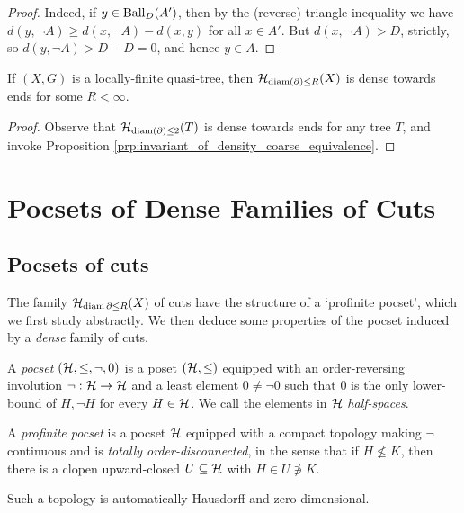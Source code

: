 \documentclass{amsart}
\begin{document}
\begin{proof}
        Indeed, if $y\in\operatorname{Ball}_D(A')$, then by the (reverse) triangle-inequality we have $d(y,\lnot A)\geq d(x,\lnot A)-d(x,y)$ for all $x\in A'$. But $d(x,\lnot A)>D$, strictly, so $d(y,\lnot A)>D-D=0$, and hence $y\in A$.
    \end{proof}

    \begin{corollary}
        If $(X,G)$ is a locally-finite quasi-tree, then $\mathcal{H}_{\operatorname{diam}(\partial)\leq R}(X)$ is dense towards ends for some $R<\infty$.
    \end{corollary}
    \begin{proof}
        Observe that $\mathcal{H}_{\operatorname{diam}(\partial)\leq2}(T)$ is dense towards ends for any tree $T$, and invoke Proposition \ref{prp:invariant_of_density_coarse_equivalence}.
    \end{proof}

    \section{Pocsets of Dense Families of Cuts}

    \subsection{Pocsets of cuts}\label{sec:pocsets_of_cuts}

    The family $\mathcal{H}_{\operatorname{diam}\partial\leq R}(X)$ of cuts have the structure of a `profinite pocset', which we first study abstractly. We then deduce some properties of the pocset induced by a \textit{dense} family of cuts.

    \begin{definition}\label{def:profinite_pocset}
        A \textit{pocset} $(\mathcal{H},\leq,\lnot,0)$ is a poset $(\mathcal{H},\leq)$ equipped with an order-reversing involution $\lnot:\mathcal{H}\to\mathcal{H}$ and a least element $0\neq\lnot0$ such that $0$ is the only lower-bound of $H,\lnot H$ for every $H\in\mathcal{H}$. We call the elements in $\mathcal{H}$ \textit{half-spaces}.

        A \textit{profinite pocset} is a pocset $\mathcal{H}$ equipped with a compact topology making $\lnot$ continuous and is \textit{totally order-disconnected}, in the sense that if $H\not\leq K$, then there is a clopen upward-closed $U\subseteq\mathcal{H}$ with $H\in U\not\ni K$.
    \end{definition}

    \begin{remark}
        Such a topology is automatically Hausdorff and zero-dimensional.
    \end{remark}
\end{document}
